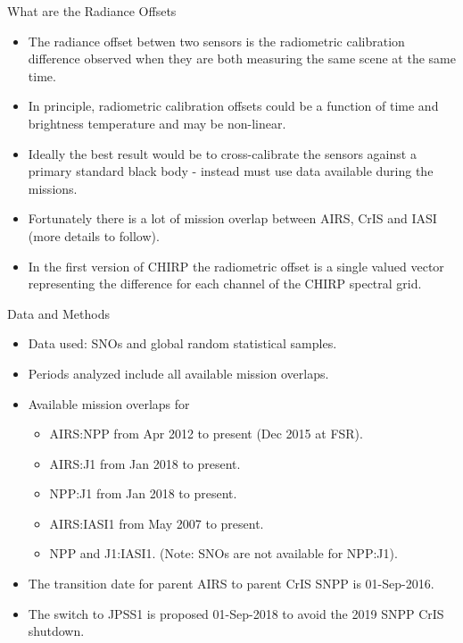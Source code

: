 \documentclass[10pt,t]{beamer}
\begin{document}
\begin{frame}{What are the Radiance Offsets}

  \begin{itemize}
  \item The radiance offset betwen two sensors is the radiometric calibration
    difference observed when they are both measuring the same scene at the same time.
  \item In principle, radiometric calibration offsets could be a function of time and
    brightness temperature and may be non-linear.
  \item Ideally the best result would be to cross-calibrate the sensors against a primary
    standard black body - instead must use data available during the missions.
  \item Fortunately there is a lot of mission overlap between AIRS, CrIS and IASI
    (more details to follow).
  \item In the first version of CHIRP the radiometric offset is a single valued vector
    representing the difference for each channel of the CHIRP spectral grid.

  \end{itemize}

\end{frame}

\begin{frame}{Data and Methods}

  \begin{itemize}
    \item Data used: SNOs and global random statistical samples.
    \item Periods analyzed include all available mission overlaps.
    \item Available mission overlaps for
      \begin{itemize}
      \item AIRS:NPP from Apr 2012 to present (Dec 2015 at FSR).
      \item AIRS:J1 from Jan 2018 to present.
      \item NPP:J1 from Jan 2018 to present.
      \item AIRS:IASI1 from May 2007 to present.
      \item NPP and J1:IASI1. (Note: SNOs are not available for NPP:J1).
      \end{itemize}
      
    \item The transition date for parent AIRS to parent CrIS SNPP is 01-Sep-2016.
    \item The switch to JPSS1 is proposed 01-Sep-2018 to avoid the 2019 SNPP CrIS
      shutdown.

  \end{itemize}
\end{frame}
\end{document}
